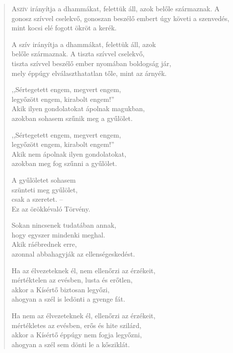 
\begin{verse}

{\par%
\lettrine[slope=0.5em]{A}{szív} {\LettrineTextFont irányítja a dhammákat, felettük áll, azok}\newline
belőle származnak. A gonosz szívvel cselekvő,\newline
gonoszan beszélő embert úgy követi a szenvedés,\verselinebreak
mint kocsi elé fogott ökröt a kerék.
\par}

 A szív irányítja a dhammákat, felettük áll, azok\\
belőle származnak. A tiszta szívvel cselekvő,\\
tiszta szívvel beszélő ember nyomában boldogság jár,\\
mely éppúgy elválaszthatatlan tőle, mint az árnyék.

 ,,Sértegetett engem, megvert engem,\\
legyőzött engem, kirabolt engem!''\\
Akik ilyen gondolatokat ápolnak magukban,\\
azokban sohasem szűnik meg a gyűlölet.

 ,,Sértegetett engem, megvert engem,\\
legyőzött engem, kirabolt engem!''\\
Akik nem ápolnak ilyen gondolatokat,\\
azokban meg fog szűnni a gyűlölet.

 A gyűlöletet sohasem\\
szünteti meg gyűlölet,\\
csak a szeretet. --\\
Ez az örökkévaló Törvény.

 Sokan nincsenek tudatában annak,\\
hogy egyszer mindenki meghal.\\
Akik ráébrednek erre,\\
azonnal abbahagyják az ellenségeskedést.

 Ha az élvezeteknek él, nem ellenőrzi az érzékeit,\\
mértéktelen az evésben, lusta és erőtlen,\\
akkor a Kísértő biztosan legyőzi,\\
ahogyan a szél is ledönti a gyenge fát.

 Ha nem az élvezeteknek él, ellenőrzi az érzékeit,\\
mértékletes az evésben, erős és hite szilárd,\\
akkor a Kísértő éppúgy nem fogja legyőzni,\\
ahogyan a szél sem dönti le a kősziklát.


\end{verse}
